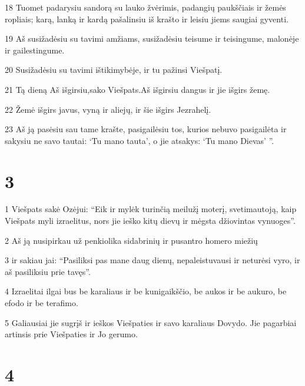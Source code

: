 \par 18 Tuomet padarysiu sandorą su lauko žvėrimis, padangių paukščiais ir žemės ropliais; karą, lanką ir kardą pašalinsiu iš krašto ir leisiu jiems saugiai gyventi. 
\par 19 Aš susižadėsiu su tavimi amžiams, susižadėsiu teisume ir teisingume, malonėje ir gailestingume. 
\par 20 Susižadėsiu su tavimi ištikimybėje, ir tu pažinsi Viešpatį. 
\par 21 Tą dieną Aš išgirsiu,­sako Viešpats.­Aš išgirsiu dangus ir jie išgirs žemę. 
\par 22 Žemė išgirs javus, vyną ir aliejų, ir šie išgirs Jezrahelį. 
\par 23 Aš ją pasėsiu sau tame krašte, pasigailėsiu tos, kurios nebuvo pasigailėta ir sakysiu ne savo tautai: ‘Tu mano tauta’, o jie atsakys: ‘Tu mano Dievas’ ”.



\chapter{3}


\par 1 Viešpats sakė Ozėjui: “Eik ir mylėk turinčią meilužį moterį, svetimautoją, kaip Viešpats myli izraelitus, nors jie ieško kitų dievų ir mėgsta džiovintas vynuoges”. 
\par 2 Aš ją nusipirkau už penkiolika sidabrinių ir pusantro homero miežių 
\par 3 ir sakiau jai: “Pasiliksi pas mane daug dienų, nepaleistuvausi ir neturėsi vyro, ir aš pasiliksiu prie tavęs”. 
\par 4 Izraelitai ilgai bus be karaliaus ir be kunigaikščio, be aukos ir be aukuro, be efodo ir be terafimo. 
\par 5 Galiausiai jie sugrįš ir ieškos Viešpaties ir savo karaliaus Dovydo. Jie pagarbiai artinsis prie Viešpaties ir Jo gerumo.



\chapter{4}


